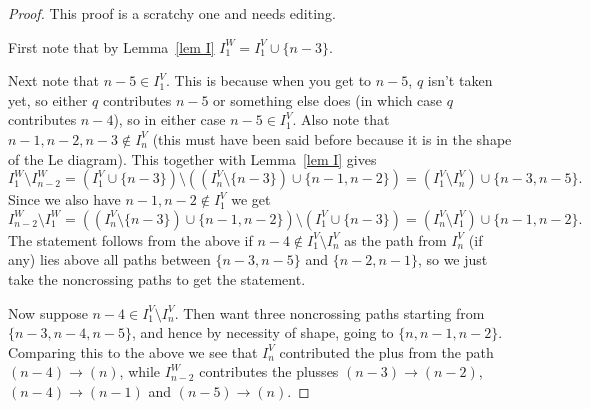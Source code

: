 \documentclass[11pt]{article}
\theoremstyle{remark}
\theoremstyle{definition}
\begin{document}
  \begin{proof}
    This proof is a scratchy one and needs editing.

      First note that by Lemma~\ref{lem I} $I_1^W = I_1^V\cup \{n-3\}$.

    
Next note that $n-5\in I_1^V$.  This is because when you get to $n-5$, $q$ isn't taken yet, so either $q$ contributes $n-5$ or something else does (in which case $q$ contributes $n-4$), so in either case $n-5 \in I_1^V$.  Also note that $n-1, n-2, n-3\not\in I_n^V$ (this must have been said before because it is in the shape of the Le diagram).  This together with Lemma~\ref{lem I} gives
    \[
    I_1^W \setminus I_{n-2}^W = (I_1^V\cup\{n-3\}) \setminus ((I_n^V\setminus \{n-3\})\cup \{n-1, n-2\}) = (I_1^V\setminus I_n^V) \cup \{n-3, n-5\}.
    \]
    Since we also have $n-1, n-2\not\in I_1^V$ we get
    \[
    I_{n-2}^W \setminus I_1^W = ((I_n^V\setminus \{n-3\})\cup \{n-1, n-2\}) \setminus(I_1^V\cup\{n-3\}) = (I_n^V\setminus I_1^V) \cup \{n-1, n-2\}.
    \]
    The statement follows from the above if $n-4\not\in I_1^V\setminus I_{n}^V$ as the path from $I_n^V$ (if any) lies above all paths between $\{n-3, n-5\}$ and $\{n-2, n-1\}$, so we just take the noncrossing paths to get the statement.
    
    Now suppose $n-4\in I_1^V\setminus I_{n}^V$.  Then want three noncrossing paths starting from $\{n-3, n-4, n-5\}$, and hence by necessity of shape, going to $\{n, n-1, n-2\}$.  Comparing this to the above we see that $I_n^V$ contributed the plus from the path $(n-4)\rightarrow (n)$, while $I_{n-2}^W$ contributes the plusses $(n-3)\rightarrow (n-2)$, $(n-4)\rightarrow (n-1)$ and $(n-5)\rightarrow (n)$.
  \end{proof}
  
\end{document}
